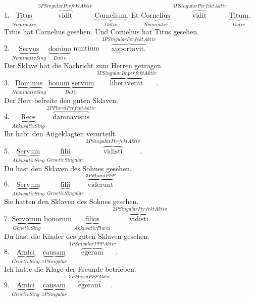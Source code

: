 \documentclass[a4paper]{article}
\newcommand{\ann}[2]{$\underbrace{\text{#1}}_{#2}$}
\newcommand{\ovv}[2]{$\overbrace{\text{#1}}^{#2}$}
\begin{document}
1. \ann{Titus}{Nominativ} \ovv{vidit}{3P Singular Perfekt Aktiv} \ann{Cornelium}{Dativ}. Et \ann{Cornelius}{Nominativ} \ovv{vidit}{3P Singular Perfekt Aktiv} \ann{Titum}{Dativ}.\\

Titus hat Cornelius gesehen. Und Cornelius hat Titus gesehen. \\

2. \ann{Servus}{Nominativ Sing} \ann{domino}{Dativ} nuntium \ovv{apportavit.}{3P Singular Perfekt Aktiv}  \\

Der Sklave hat die Nachricht zum Herren getragen. \\

3. \ann{Dominus}{Nominativ Sing} \ann{bonum servum}{Dativ} \ovv{liberaverat}{3P Singular Imperfekt Aktiv}. \\

Der Herr befreite den guten Sklaven. \\

4. \ann{Reos}{AkkusativSing } \ovv{damnavistis}{2P Plural Perfekt Aktiv} \\

Ihr habt den Angeklagten verurteilt. \\

5. \ann{Servum}{Akkusativ Sing} \ann{filii}{Genetiv Singular} \ovv{vidisti}{2P Singular Perfekt Aktiv}. \\

Du hast den Sklaven des Sohnes gesehen. \\

6. \ann{Servum}{Akkusativ Sing} \ann{filii}{Genetiv Singular} \ovv{viderunt}{3P Plural PPP}. \\

Sie hatten den Sklaven des Sohnes gesehen. \\

7. \ann{Servorum}{Genetiv Sing} bonorum \ann{filios}{Akkusativ Plural} \ovv{vidisti.}{2P Singular Perfekt Aktiv} \\

Du hast die Kinder des guten Sklaven gesehen. \\

8. \ann{Amici}{Genetiv Sing} \ann{causam}{1P Singular} \ovv{egeram}{1P Singular PPP Aktiv}. \\

Ich hatte die Klage der Freunde betrieben. \\

9. \ann{Amici}{Genetiv Sing} \ann{causam}{1P Singular} \ovv{egerant}{3P Plural PPP Aktiv}. \\
\end{document}
